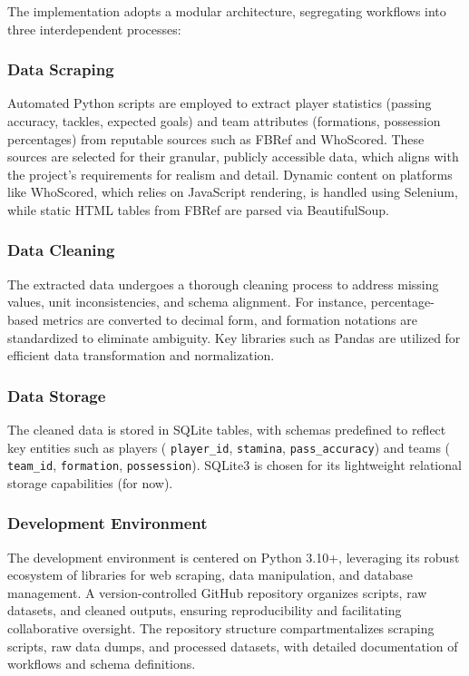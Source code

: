 \documentclass[12pt]{article}
\begin{document}
The implementation adopts a modular architecture, segregating workflows into three interdependent processes:

\subsubsection{Data Scraping}
Automated Python scripts are employed to extract player statistics (passing accuracy, tackles, expected goals) and team attributes (formations, possession percentages) from reputable sources such as FBRef and WhoScored. These sources are selected for their granular, publicly accessible data, which aligns with the project's requirements for realism and detail. Dynamic content on platforms like WhoScored, which relies on JavaScript rendering, is handled using Selenium, while static HTML tables from FBRef are parsed via BeautifulSoup.

\subsubsection{Data Cleaning}
The extracted data undergoes a thorough cleaning process to address missing values, unit inconsistencies, and schema alignment. For instance, percentage-based metrics are converted to decimal form, and formation notations are standardized to eliminate ambiguity. Key libraries such as Pandas are utilized for efficient data transformation and normalization.

\subsubsection{Data Storage}
The cleaned data is stored in SQLite tables, with schemas predefined to reflect key entities such as players ( \texttt{player\_id}, \texttt{stamina}, \texttt{pass\_accuracy}) and teams ( \texttt{team\_id}, \texttt{formation}, \texttt{possession}). SQLite3 is chosen for its lightweight relational storage capabilities (for now).

\subsubsection{Development Environment}
The development environment is centered on Python 3.10+, leveraging its robust ecosystem of libraries for web scraping, data manipulation, and database management. A version-controlled GitHub repository organizes scripts, raw datasets, and cleaned outputs, ensuring reproducibility and facilitating collaborative oversight. The repository structure compartmentalizes scraping scripts, raw data dumps, and processed datasets, with detailed documentation of workflows and schema definitions.
\end{document}
